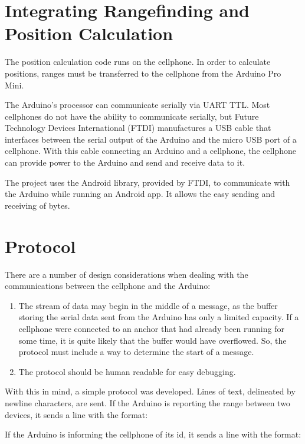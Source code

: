 \section{Integrating Rangefinding and Position Calculation}
The position calculation code runs on the cellphone. In order to calculate positions, ranges must be transferred to the cellphone from the Arduino Pro Mini. 

The Arduino's processor can communicate serially via UART TTL. Most cellphones do not have the ability to communicate serially, but Future Technology Devices International (FTDI) manufactures a USB cable that interfaces between the serial output of the Arduino and the micro USB port of a cellphone. With this cable connecting an Arduino and a cellphone, the cellphone can provide power to the Arduino and send and receive data to it.

The project uses the Android  library, provided by FTDI, to communicate with the Arduino while running an Android app. It allows the easy sending and receiving of bytes. 

\section{Protocol}
There are a number of design considerations when dealing with the communications between the cellphone and the Arduino:
\begin{enumerate}
	\item The stream of data may begin in the middle of a message, as the buffer storing the serial data sent from the Arduino has only a limited capacity. If a cellphone were connected to an anchor that had already been running for some time, it is quite likely that the buffer would have overflowed. So, the protocol must include a way to determine the start of a message.
	\item The protocol should be human readable for easy debugging.
\end{enumerate}

With this in mind, a simple protocol was developed. Lines of text, delineated by newline characters, are sent. If the Arduino is reporting the range between two devices, it sends a line with the format:

\begin{center}
\end{center}

If the Arduino is informing the cellphone of its id, it sends a line with the format:

